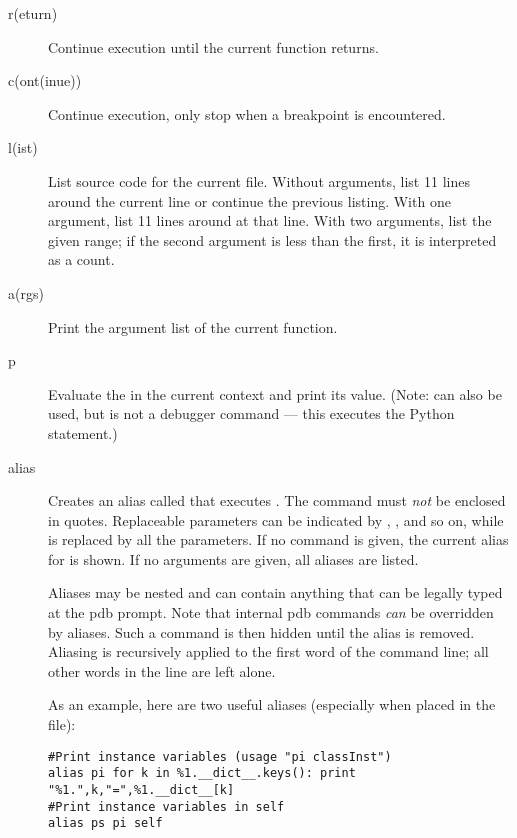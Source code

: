 \begin{description}
\item[r(eturn)]

Continue execution until the current function returns.

\item[c(ont(inue))]

Continue execution, only stop when a breakpoint is encountered.

\item[l(ist) ]

List source code for the current file.  Without arguments, list 11
lines around the current line or continue the previous listing.  With
one argument, list 11 lines around at that line.  With two arguments,
list the given range; if the second argument is less than the first,
it is interpreted as a count.

\item[a(rgs)]

Print the argument list of the current function.

\item[p ]

Evaluate the  in the current context and print its
value.  (Note:  can also be used, but is not a debugger
command --- this executes the Python  statement.)

\item[alias ]

Creates an alias called  that executes .  The
command must \emph{not} be enclosed in quotes.  Replaceable parameters
can be indicated by , , and so on, while \samp{\%*} is
replaced by all the parameters.  If no command is given, the current
alias for  is shown. If no arguments are given, all
aliases are listed.

Aliases may be nested and can contain anything that can be
legally typed at the pdb prompt.  Note that internal pdb commands
\emph{can} be overridden by aliases.  Such a command is
then hidden until the alias is removed.  Aliasing is recursively
applied to the first word of the command line; all other words
in the line are left alone.

As an example, here are two useful aliases (especially when placed
in the  file):

\begin{verbatim}
#Print instance variables (usage "pi classInst")
alias pi for k in %1.__dict__.keys(): print "%1.",k,"=",%1.__dict__[k]
#Print instance variables in self
alias ps pi self
\end{verbatim}
		

\end{description}

